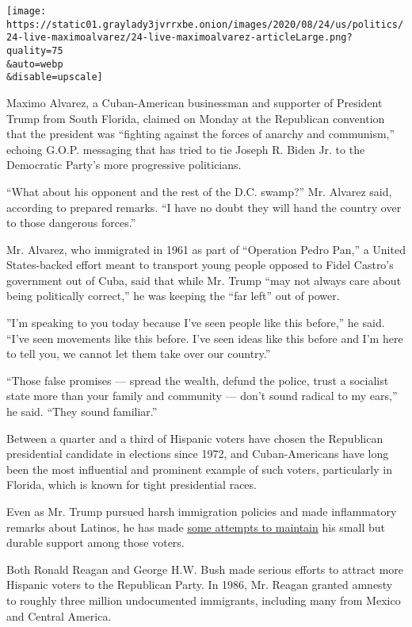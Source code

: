 \texttt{[image: https://static01.graylady3jvrrxbe.onion/images/2020/08/24/us/politics/24-live-maximoalvarez/24-live-maximoalvarez-articleLarge.png?quality=75\\\&auto=webp\\\&disable=upscale]}

Maximo Alvarez, a Cuban-American businessman and supporter of President
Trump from South Florida, claimed on Monday at the Republican convention
that the president was ``fighting against the forces of anarchy and
communism,'' echoing G.O.P. messaging that has tried to tie Joseph R.
Biden Jr. to the Democratic Party's more progressive politicians.

``What about his opponent and the rest of the D.C. swamp?'' Mr. Alvarez
said, according to prepared remarks. ``I have no doubt they will hand
the country over to those dangerous forces.''

Mr. Alvarez, who immigrated in 1961 as part of ``Operation Pedro Pan,''
a United States-backed effort meant to transport young people opposed to
Fidel Castro's government out of Cuba, said that while Mr. Trump ``may
not always care about being politically correct,'' he was keeping the
``far left'' out of power.

''I'm speaking to you today because I've seen people like this before,''
he said. ``I've seen movements like this before. I've seen ideas like
this before and I'm here to tell you, we cannot let them take over our
country.''

``Those false promises --- spread the wealth, defund the police, trust a
socialist state more than your family and community --- don't sound
radical to my ears,'' he said. ``They sound familiar.''

Between a quarter and a third of Hispanic voters have chosen the
Republican presidential candidate in elections since 1972, and
Cuban-Americans have long been the most influential and prominent
example of such voters, particularly in Florida, which is known for
tight presidential races.

Even as Mr. Trump pursued harsh immigration policies and made
inflammatory remarks about Latinos, he has made
\href{https://www.nytimes3xbfgragh.onion/2020/07/19/us/goya-trump-hispanic-vote.html}{some
attempts to maintain} his small but durable support among those voters.

Both Ronald Reagan and George H.W. Bush made serious efforts to attract
more Hispanic voters to the Republican Party. In 1986, Mr. Reagan
granted amnesty to roughly three million undocumented immigrants,
including many from Mexico and Central America.

